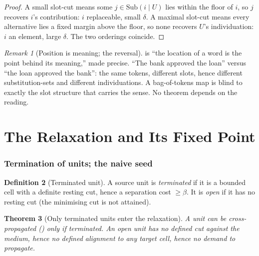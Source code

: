 \documentclass[11pt,a4paper]{article}
\theoremstyle{thmstyle}
\newtheorem{theorem}{Theorem}[section]
\theoremstyle{definition}
\newtheorem{definition}[theorem]{Definition}
\theoremstyle{remark}
\newtheorem{remark}[theorem]{Remark}
\newcommand{\flo}{\beta}               %
\newcommand{\abl}{\delta}              %
\begin{document}
\begin{proof}
A small slot-cut means some $j\in\mathrm{Sub}(i\mid U)$ lies within the floor
of $i$, so $j$ recovers $i$'s contribution: $i$ replaceable, small $\abl$. A
maximal slot-cut means every alternative lies a fixed margin above the floor,
so none recovers $U$'s individuation: $i$ an element, large $\abl$. The two
orderings coincide.
\end{proof}

\begin{remark}[Position is meaning; the reversal]
\label{rem:position}
 is ``the location of a word is the point behind its
meaning,'' made precise. ``The bank approved the loan'' versus ``the loan
approved the bank'': the same tokens, different slots, hence different
substitution-sets and different individuations. A bag-of-tokens map is blind
to exactly the slot structure that carries the sense. No theorem depends on
the reading.
\end{remark}

\part{The Relaxation and Its Fixed Point}

\section{Termination of units; the naive seed}
\label{sec:setup}

\begin{definition}[Terminated unit]
\label{def:terminated}
A source unit is \emph{terminated} if it is a bounded cell with a definite
resting cut, hence a separation cost $\ge\flo$. It is \emph{open} if it has
no resting cut (the minimising cut is not attained).
\end{definition}

\begin{theorem}[Only terminated units enter the relaxation]
\label{thm:terminate}
A unit can be cross-propagated () only if terminated.
An open unit has no defined cut against the medium, hence no defined
alignment to any target cell, hence no demand to propagate.
\end{theorem}
\end{document}
